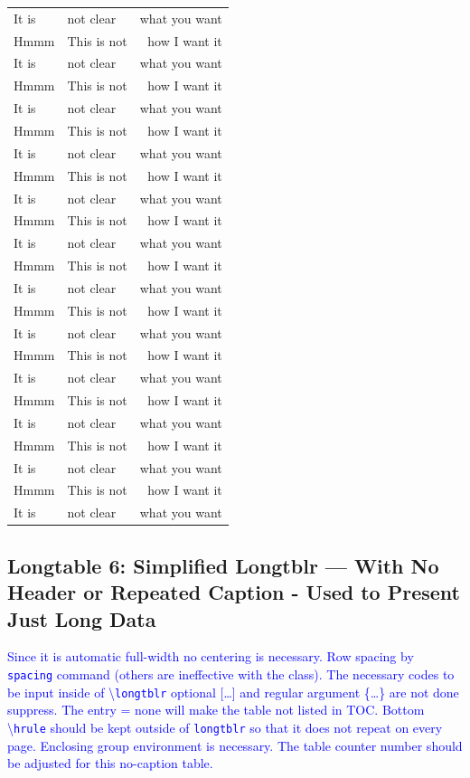\documentclass[phd]{ndsu-thesis-2022}
\newcommand\italk[1]{\textcolor{blue}{#1}}  %
\newcommand\cmd[1]{\textbackslash\texttt{#1}}  %
\newcommand\vb[1]{\textcolor{blue}{\texttt{#1}}}%
\begin{document}
\begin{longtable}{l @{\hspace{2cm}} l @{\hspace{1.5cm}} r}
It is   & not clear     & what you want \\
Hmmm    & This is not   & how I want it \\
It is   & not clear     & what you want \\
Hmmm    & This is not   & how I want it \\
It is   & not clear     & what you want \\
Hmmm    & This is not   & how I want it \\
It is   & not clear     & what you want \\
Hmmm    & This is not   & how I want it \\
It is   & not clear     & what you want \\
Hmmm    & This is not   & how I want it \\
It is   & not clear     & what you want \\
Hmmm    & This is not   & how I want it \\
It is   & not clear     & what you want \\
Hmmm    & This is not   & how I want it \\
It is   & not clear     & what you want \\
Hmmm    & This is not   & how I want it \\
It is   & not clear     & what you want \\
Hmmm    & This is not   & how I want it \\
It is   & not clear     & what you want \\
Hmmm    & This is not   & how I want it \\
It is   & not clear     & what you want \\
Hmmm    & This is not   & how I want it \\
It is   & not clear     & what you want \\
\end{longtable}
\endgroup
\addtocounter{table}{-1}%

\kant[9]

\subsection{Longtable 6: Simplified Longtblr --- With No Header or Repeated Caption - Used to Present Just Long Data}

\italk{Since it is automatic full-width no centering is necessary. Row spacing by \texttt{spacing} command (others are ineffective with the class). The necessary codes to be input inside of \cmd{longtblr} optional [\ldots] and regular argument \{\ldots\} are not done suppress. The entry = none will make the table not listed in TOC. Bottom \cmd{hrule} should be kept outside of \vb{longtblr} so that it does not repeat on every page. Enclosing group environment is necessary. The table counter number should be adjusted for this no-caption table.}
\end{document}
